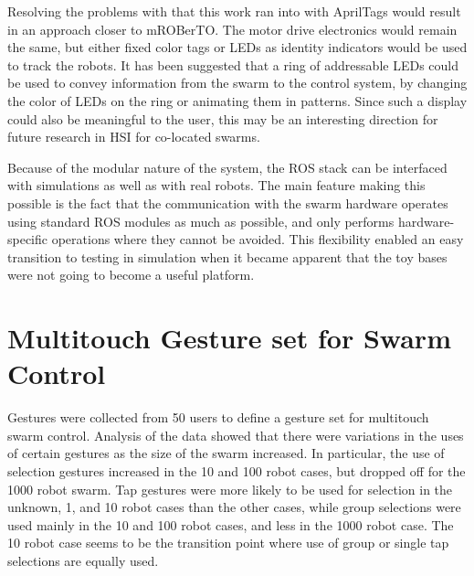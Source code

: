 Resolving the problems with that this work ran into with AprilTags would result in an approach closer to mROBerTO.
The motor drive electronics would remain the same, but either fixed color tags or LEDs as identity indicators would be used to track the robots. 
It has been suggested that a ring of addressable LEDs could be used to convey information from the swarm to the control system, by changing the color of LEDs on the ring or animating them in patterns. 
Since such a display could also be meaningful to the user, this may be an interesting direction for future research in HSI for co-located swarms.  

Because of the modular nature of the system, the ROS stack can be interfaced with simulations as well as with real robots. 
The main feature making this possible is the fact that the communication with the swarm hardware operates using standard ROS modules as much as possible, and only performs hardware-specific operations where they cannot be avoided. 
This flexibility enabled an easy transition to testing in simulation when it became apparent that the toy bases were not going to become a useful platform. 

\section{Multitouch Gesture set for Swarm Control} \label{section:Multitouch_Gesture_set_for_Swarm_Control}

Gestures were collected from 50 users to define a gesture set for multitouch swarm control. 
Analysis of the data showed that there were variations in the uses of certain gestures as the size of the swarm increased. 
In particular, the use of selection gestures increased in the 10 and 100 robot cases, but dropped off for the 1000 robot swarm. 
Tap gestures were more likely to be used for selection in the unknown, 1, and 10 robot cases than the other cases, while group selections were used mainly in the 10 and 100 robot cases, and less in the 1000 robot case. 
The 10 robot case seems to be the transition point where use of group or single tap selections are equally used. 


